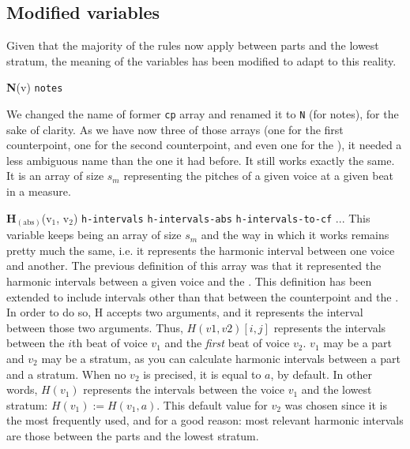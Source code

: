 \subsection{Modified variables} \label{subsection:modified_variables}
Given that the majority of the rules now apply between parts and the lowest stratum, the meaning of the variables has been modified to adapt to this reality. 

\vspace{.5cm} \noindent \textbf{N}(v) \hspace{.2cm} \texttt{notes} 

We changed the name of former \texttt{cp} array and renamed it to \texttt{N} (for notes), for the sake of clarity. As we have now three of those arrays (one for the first counterpoint, one for the second counterpoint, and even one for the \cf), it needed a less ambiguous name than the one it had before.
It still works exactly the same. It is an array of size $s_m$ representing the pitches of a given voice at a given beat in a measure.



\vspace{.5cm} \noindent \textbf{H}$_{(\text{abs})}$(v$_1$, v$_2$) \hspace{.2cm} \texttt{h-intervals}\hspace{.2cm} \texttt{h-intervals-abs}\hspace{.2cm} \texttt{h-intervals-to-cf}\hspace{.2cm}  ...
This variable keeps being an array of size $s_m$ and the way in which it works remains pretty much the same, i.e. it represents the harmonic interval between one voice and another. The previous definition of this array was that it represented the harmonic intervals between a given voice and the \cf. This definition has been extended to include intervals other than that between the counterpoint and the \cf. In order to do so, H accepts two arguments, and it represents the interval between those two arguments. Thus, $H(v1,v2)[i,j]$ represents the intervals between the $i$th beat of voice $v_1$ and the \textit{first} beat of voice $v_2$. $v_1$ may be a part and $v_2$ may be a stratum, as you can calculate harmonic intervals between a part and a stratum. When no $v_2$ is precised, it is equal to $a$, by default. In other words, $H(v_1)$ represents the intervals between the voice $v_1$ and the lowest stratum: $H(v_1) := H(v_1,a)$. This default value for $v_2$ was chosen since it is the most frequently used, and for a good reason: most relevant harmonic intervals are those between the parts and the lowest stratum.

